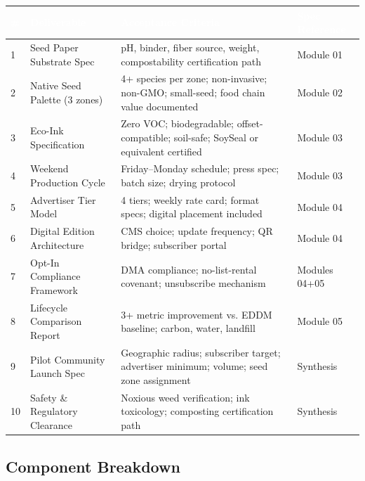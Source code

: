 \documentclass[11pt,letterpaper]{article}
\newcommand{\tableheader}[1]{\textbf{\sffamily\textcolor{white}{#1}}}
\begin{document}
\begin{center}
\begin{tabularx}{\textwidth}{C{0.6cm}L{3.5cm}L{4cm}L{4cm}}
\toprule
{}
\tableheader{\#} & \tableheader{Deliverable} & \tableheader{Acceptance Criteria} & \tableheader{Spec Reference} \\
 & Seed Paper Substrate Spec & pH, binder, fiber source, weight, compostability certification path & Module 01 \\
2 & Native Seed Palette (3 zones) & 4+ species per zone; non-invasive; non-GMO; small-seed; food chain value documented & Module 02 \\
3 & Eco-Ink Specification & Zero VOC; biodegradable; offset-compatible; soil-safe; SoySeal or equivalent certified & Module 03 \\
4 & Weekend Production Cycle & Friday--Monday schedule; press spec; batch size; drying protocol & Module 03 \\
5 & Advertiser Tier Model & 4 tiers; weekly rate card; format specs; digital placement included & Module 04 \\
6 & Digital Edition Architecture & CMS choice; update frequency; QR bridge; subscriber portal & Module 04 \\
7 & Opt-In Compliance Framework & DMA compliance; no-list-rental covenant; unsubscribe mechanism & Modules 04+05 \\
8 & Lifecycle Comparison Report & 3+ metric improvement vs. EDDM baseline; carbon, water, landfill & Module 05 \\
9 & Pilot Community Launch Spec & Geographic radius; subscriber target; advertiser minimum; volume; seed zone assignment & Synthesis \\
10 & Safety \& Regulatory Clearance & Noxious weed verification; ink toxicology; composting certification path & Synthesis \\
\bottomrule
\end{tabularx}
\end{center}

\subsection{Component Breakdown}
\end{document}
